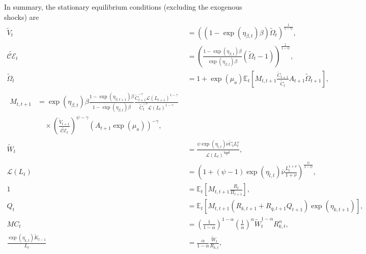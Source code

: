 \documentclass[12 pt, oneside]{article}
\theoremstyle{definition}
\theoremstyle{definition}
\theoremstyle{definition}
\newcommand{\E}{\mathbb{E}}
\newcommand{\calC}{\mathcal{C}}
\newcommand{\calE}{\mathcal{E}}
\newcommand{\calL}{\mathcal{L}}
\begin{document}
In summary, the stationary equilibrium conditions (excluding the exogenous shocks) are
\begin{align}
  \label{eq:epstein zin defn eqm stat}
  \tilde{V}_t & = ((1 - \exp(\eta_{\beta, t})\beta)\tilde{\Omega}_t)^{\frac{1}{1 - \psi}},\\
  \label{eq:certainty equivalent eqm stat}
  \tilde{\calC\calE}_t & = \left(\frac{1 - \exp(\eta_{\beta, t})\beta}{\exp(\eta_{\beta, t})\beta}(\tilde{\Omega}_t - 1)\right)^{\frac{1}{1 - \psi}},\\
  \label{eq:epstein zin wealth recursion eqm stat}
  \tilde{\Omega}_t & = 1 + \exp(\mu_a)\E_t\left[M_{t, t + 1}\frac{\tilde{C}_{t + 1}}{\tilde{C}_t}A_{t + 1}\tilde{\Omega}_{t + 1}\right],\\
  \label{eq:stochastic discount factor eqm stat}
  \begin{split}
  M_{t, t + 1} & = \exp(\eta_{\beta, t})\beta\frac{1 - \exp(\eta_{\beta, t + 1})\beta}{1 - \exp(\eta_{\beta, t})\beta} \frac{\tilde{C}_{t + 1}^{- \gamma } \calL(L_{t + 1})^{1 - \gamma}}{\tilde{C}_t^{-\gamma} \calL(L_t)^{1 - \gamma}}\\
  &\quad \times\left(\frac{\tilde{V}_{t + 1}}{\tilde{\calC\calE}_t}\right)^{ \psi - \gamma}\left(A_{t + 1}\exp(\mu_a)\right)^{-\gamma},
  \end{split}\\
  \label{eq:intratemporal consumption labor eqm stat}
  \tilde{W}_t & = \frac{\psi \exp(\eta_{l, t})\overline{\nu} \tilde{C}_t L_t^\nu}{\calL(L_t)^{\frac{1 - \psi}{\psi}}},\\
  \label{eq:labor disutility function eqm stat}
  \calL(L_t) & = \left(1 + (\psi - 1)\exp(\eta_{l, t})\overline{\nu}\frac{L_t^{1 + \nu}}{1 + \nu}\right)^{\frac{\psi}{1-\psi}},\\
  \label{eq:euler eqn eqm stat}
  1 & = \E_t\left[M_{t, t + 1}\frac{R_t}{\Pi_{t + 1}}\right],\\
  \label{eq:capital asset pricing eqm stat}
  Q_t & = \E_t\left[M_{t, t + 1} \left(R_{k, t + 1} + R_{q, t + 1}Q_{t + 1}\right)\exp(\eta_{k, t + 1})\right],\\
  \label{eq:mc soln eqm stat}
  MC_t & =  \left(\frac{1}{1 - \alpha}\right)^{1 - \alpha}\left(\frac{1}{\alpha}\right)^{\alpha}\tilde{W}_t^{1 - \alpha}R_{k, t}^{\alpha},\\
  \label{eq:optimal capital labor ratio eqm stat}
  \frac{\exp(\eta_{k, t})\tilde{K}_{t - 1}}{L_t} & =\frac{\alpha}{1 - \alpha} \frac{\tilde{W}_t}{R_{k, t}},\\
  \label{eq:real optimal reset price eqm stat}

\end{align}
\end{document}
